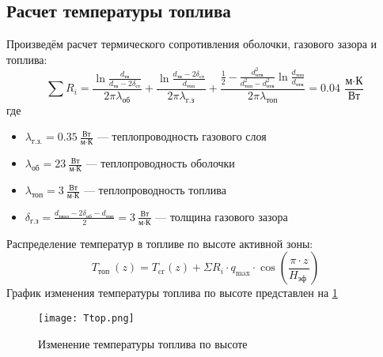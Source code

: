 \subsection{Расчет температуры топлива}
    Произведём расчет термического сопротивления оболочки, газового зазора и топлива:
$$
\sum R_i = 
\frac {\ln \frac {d_{\text{тв}}}{d_{\text{тв}} - 2\delta_{ст}}  }{2\pi\lambda_{\text{об}}}+\frac {\ln \frac {d_{\text{тв}} - 2\delta_{ст}}{d_{\text{топ}}}  }{2\pi\lambda_{\text{г.з}}}+\frac {\frac 1 2 - \frac {d_{\text{отв}}^2} {d_{\text{топ}}^2 - d_{\text{отв}}^2}\ln \frac {d_{\text{топ}}}{d_{\text{отв}}}} {2 \pi \lambda_{\text{топ}}} = 0.04\  \frac{\text{м} \cdot \text{К}}{\text{Вт}}
$$
где
\begin{itemize}
    \item $\lambda_{\text{г.з.}} = 0.35\  \frac {\text{Вт}}{\text{м} \cdot \text{К}}$ — теплопроводность газового слоя 
    \item $\lambda_{\text{об}} = 23\  \frac {\text{Вт}}{\text{м} \cdot \text{К}}$ — теплопроводность оболочки 
    \item $\lambda_{\text{топ}} = 3\  \frac {\text{Вт}}{\text{м} \cdot \text{К}}$ — теплопроводность топлива
    \item $\delta_{\text{г.з}} =\frac {d_{\text{твэл}} - 2\delta_{\text{об}} - d_{\text{топ}}}{2} =  3\  \frac {\text{Вт}}{\text{м} \cdot \text{К}}$ — толщина газового зазора 
\end{itemize}
Распределение температур в топливе по высоте активной зоны:
$$
T_{\text {топ }}(z)=T_{\mathrm{cr}}(z)+\Sigma R_{i} \cdot q_{\max } \cdot \cos \left(\frac{\pi \cdot z}{H_{\text {эф }}}\right)
$$
График изменения температуры топлива по высоте представлен на \ref{pic:top}
\begin{figure}[H]
	\begin{center}
		\texttt{[image: Ttop.png]}
		\caption{Изменение температуры топлива по высоте}
		\label{pic:top} %
	\end{center}
\end{figure}
